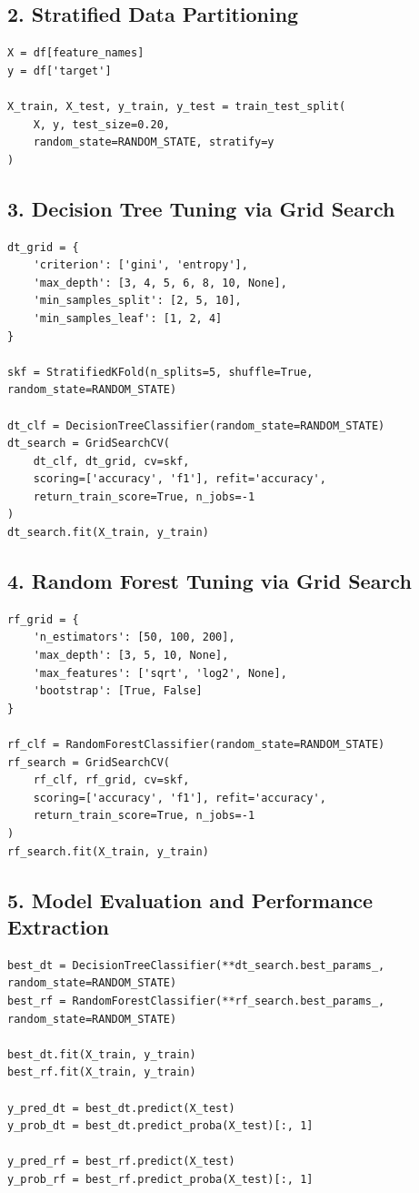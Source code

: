 \documentclass[12pt,a4paper]{article}
\begin{document}
\subsection*{2. Stratified Data Partitioning}
\begin{lstlisting}
X = df[feature_names]
y = df['target']

X_train, X_test, y_train, y_test = train_test_split(
    X, y, test_size=0.20,
    random_state=RANDOM_STATE, stratify=y
)
\end{lstlisting}

\subsection*{3. Decision Tree Tuning via Grid Search}
\begin{lstlisting}
dt_grid = {
    'criterion': ['gini', 'entropy'],
    'max_depth': [3, 4, 5, 6, 8, 10, None],
    'min_samples_split': [2, 5, 10],
    'min_samples_leaf': [1, 2, 4]
}

skf = StratifiedKFold(n_splits=5, shuffle=True, random_state=RANDOM_STATE)

dt_clf = DecisionTreeClassifier(random_state=RANDOM_STATE)
dt_search = GridSearchCV(
    dt_clf, dt_grid, cv=skf,
    scoring=['accuracy', 'f1'], refit='accuracy',
    return_train_score=True, n_jobs=-1
)
dt_search.fit(X_train, y_train)
\end{lstlisting}

\subsection*{4. Random Forest Tuning via Grid Search}
\begin{lstlisting}
rf_grid = {
    'n_estimators': [50, 100, 200],
    'max_depth': [3, 5, 10, None],
    'max_features': ['sqrt', 'log2', None],
    'bootstrap': [True, False]
}

rf_clf = RandomForestClassifier(random_state=RANDOM_STATE)
rf_search = GridSearchCV(
    rf_clf, rf_grid, cv=skf,
    scoring=['accuracy', 'f1'], refit='accuracy',
    return_train_score=True, n_jobs=-1
)
rf_search.fit(X_train, y_train)
\end{lstlisting}

\subsection*{5. Model Evaluation and Performance Extraction}
\begin{lstlisting}
best_dt = DecisionTreeClassifier(**dt_search.best_params_, random_state=RANDOM_STATE)
best_rf = RandomForestClassifier(**rf_search.best_params_, random_state=RANDOM_STATE)

best_dt.fit(X_train, y_train)
best_rf.fit(X_train, y_train)

y_pred_dt = best_dt.predict(X_test)
y_prob_dt = best_dt.predict_proba(X_test)[:, 1]

y_pred_rf = best_rf.predict(X_test)
y_prob_rf = best_rf.predict_proba(X_test)[:, 1]
\end{lstlisting}
\end{document}
